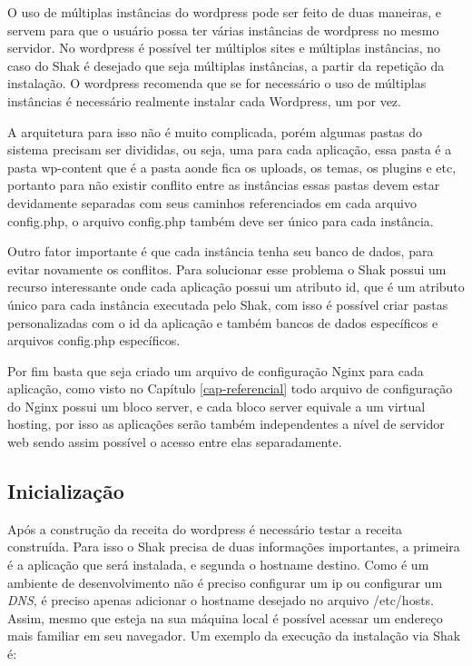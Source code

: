 O uso de múltiplas instâncias do wordpress pode ser feito de duas maneiras, e servem
para que o usuário possa ter várias instâncias de wordpress no mesmo servidor. No 
wordpress é possível ter múltiplos sites e múltiplas
instâncias, no caso do Shak é desejado que seja múltiplas instâncias, a partir da
repetição da instalação. O wordpress recomenda que se for necessário o uso de múltiplas
instâncias é necessário realmente instalar cada Wordpress, um por vez.

A arquitetura para isso não é muito complicada, porém algumas pastas do sistema
precisam ser divididas, ou seja, uma para cada aplicação, essa pasta é a pasta wp-content
que é a pasta aonde fica os uploads, os temas, os plugins e etc, portanto para não
existir conflito entre as instâncias essas pastas devem estar devidamente separadas
com seus caminhos referenciados em cada arquivo config.php, o arquivo config.php também
deve ser único para cada instância. 

Outro fator importante é que cada instância
tenha seu banco de dados, para evitar novamente os conflitos. Para
solucionar esse problema o Shak possui um recurso interessante onde cada aplicação
possui um atributo id, que é um atributo único para cada instância executada pelo
Shak, com isso é possível criar pastas personalizadas com o id da aplicação e também
bancos de dados específicos e arquivos config.php específicos.

Por fim basta que seja criado um arquivo de configuração Nginx para cada aplicação,
como visto no Capítulo \ref{cap-referencial} todo arquivo de configuração
do Nginx possui um bloco server, e cada bloco server equivale a um virtual hosting,
por isso as aplicações serão também independentes a nível de servidor web sendo assim
possível o acesso entre elas separadamente.

\subsection{Inicialização}

Após a construção da receita do wordpress é necessário testar a receita construída. 
Para isso o Shak precisa de duas informações importantes, a primeira é a aplicação
que será instalada, e segunda o hostname destino. Como é um ambiente de desenvolvimento
não é preciso configurar um ip ou configurar um \textit{DNS}, é preciso apenas adicionar o
hostname desejado no arquivo /etc/hosts. Assim, mesmo que esteja na sua máquina local
é possível acessar um endereço mais familiar em seu navegador. Um exemplo da execução
da instalação via Shak é:

